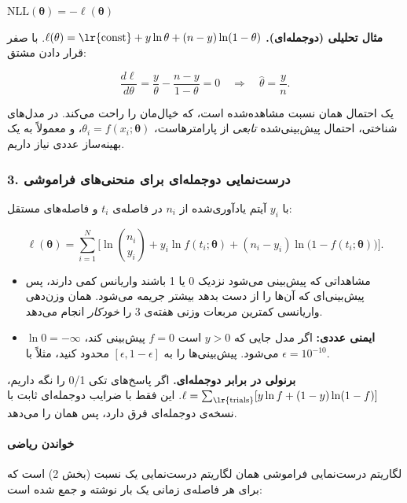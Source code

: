 \(\mathrm{NLL}(\boldsymbol\theta) = -\ell(\boldsymbol\theta)\)

\textbf{مثال تحلیلی (دوجمله‌ای).}
\(\ell(\theta) = \text{\lr{const}} + y\ln\theta + (n-y)\ln(1-\theta)\). با
صفر قرار دادن مشتق:

\[
\frac{d\ell}{d\theta} = \frac{y}{\theta} - \frac{n-y}{1-\theta} = 0 \quad\Rightarrow\quad \hat\theta = \frac{y}{n}.
\]

 یک احتمال همان نسبت مشاهده‌شده است، که خیال‌مان را راحت می‌کند. در
مدل‌های شناختی، احتمال پیش‌بینی‌شده \emph{تابعی} از پارامترهاست،
\(\theta_i = f(x_i;\boldsymbol\theta)\)، و معمولاً به یک بهینه‌ساز عددی
نیاز داریم.

\subsubsection{3. درست‌نمایی دوجمله‌ای برای منحنی‌های فراموشی}

با \(y_i\) آیتم یادآوری‌شده از \(n_i\) در فاصله‌ی \(t_i\) و فاصله‌های
مستقل:

\[
\ell(\boldsymbol\theta) = \sum_{i=1}^{N}\Big[\ln\binom{n_i}{y_i} + y_i \ln f(t_i;\boldsymbol\theta) + (n_i - y_i)\ln\big(1 - f(t_i;\boldsymbol\theta)\big)\Big].
\]

\begin{itemize}
\tightlist
\item
  مشاهداتی که پیش‌بینی می‌شود نزدیک 0 یا 1 باشند واریانس کمی دارند، پس
  پیش‌بینی‌ای که آن‌ها را از دست بدهد بیشتر جریمه می‌شود.  همان
  وزن‌دهی واریانسی کمترین مربعات وزنی هفته‌ی 3 را \emph{خودکار} انجام
  می‌دهد.
\item
  \textbf{ایمنی عددی:} اگر مدل جایی که \(y > 0\) است \(f = 0\) پیش‌بینی
  کند، \(\ln 0 = -\infty\) می‌شود. پیش‌بینی‌ها را به
  \([\epsilon, 1-\epsilon]\) محدود  کنید، مثلاً با
  \(\epsilon = 10^{-10}\).
\end{itemize}

\textbf{برنولی در برابر دوجمله‌ای.} اگر پاسخ‌های تکی 0/1 را نگه داریم،
\(\ell = \sum_{\text{\lr{trials}}} [y\ln f + (1-y)\ln(1-f)]\). این فقط با
ضرایب دوجمله‌ای ثابت با نسخه‌ی دوجمله‌ای فرق دارد، پس همان  را
می‌دهد.

\paragraph{خواندن ریاضی}

لگاریتم درست‌نمایی فراموشی همان لگاریتم درست‌نمایی یک نسبت (بخش 2) است که
برای هر فاصله‌ی زمانی یک بار نوشته و جمع شده است:

